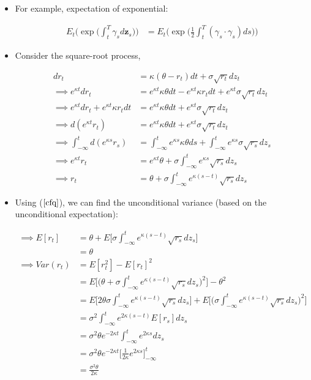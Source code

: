\documentclass{article}
\newcommand{\zbf}{\mathbf{z}}
\begin{document}
\begin{itemize}
\item For example, expectation of exponential:

\begin{align}
E_t \Bigg( \exp \Bigg( \int_t^T \gamma_s d\zbf_s \Bigg) \Bigg) 
&= E_t \Bigg( \exp \Bigg( \frac{1}{2} \int_t^T (\gamma_s \cdot \gamma_s)ds \Bigg) \Bigg) \label{cfe}
\end{align}

\item Consider the square-root process,

\begin{align*}
dr_t &= \kappa(\theta - r_t)dt + \sigma \sqrt{r_t} dz_t\\
\implies e^{\kappa t} dr_t &= e^{\kappa t}\kappa \theta dt  - e^{\kappa t} \kappa r_t dt + e^{\kappa t}\sigma \sqrt{r_t} dz_t \\
\implies e^{\kappa t} dr_t + e^{\kappa t} \kappa r_t dt&= e^{\kappa t}\kappa \theta dt  + e^{\kappa t}\sigma \sqrt{r_t} dz_t \\
\implies d(e^{\kappa t} r_t) &= e^{\kappa t}\kappa \theta dt  + e^{\kappa t}\sigma \sqrt{r_t} dz_t \\
\implies \int_{-\infty}^{t} d(e^{\kappa s} r_s) &= \int_{-\infty}^{t} e^{\kappa s}\kappa \theta ds  + \int_{-\infty}^{t} e^{\kappa s}\sigma \sqrt{r_s} dz_s \\
\implies e^{\kappa t} r_t &= e^{\kappa t}\theta  + \sigma\int_{-\infty}^{t} e^{\kappa s} \sqrt{r_s} dz_s \\
\implies r_t &= \theta  + \sigma\int_{-\infty}^{t} e^{\kappa (s-t)} \sqrt{r_s} dz_s
\end{align*}

\pagebreak

\item Using ($\ref{cfq}$), we can find the unconditional variance (based on the unconditional expectation):

\begin{align*}
\implies E[r_t] 
&= \theta  + E\Bigg[\sigma\int_{-\infty}^{t} e^{\kappa (s-t)} \sqrt{r_s}dz_s \Bigg] \\
&= \theta \\
\implies Var(r_t) 
&= E[r_t^2] - E[r_t]^2 \\
&= E\Bigg[\Bigg(\theta  + \sigma\int_{-\infty}^{t} e^{\kappa (s-t)} \sqrt{r_s}dz_s \Bigg)^2 \Bigg] - \theta^2 \\
&= E\Bigg[2\theta  \sigma\int_{-\infty}^{t} e^{\kappa (s-t)} \sqrt{r_s}dz_s \Bigg] 
+ E\Bigg[\Bigg( \sigma\int_{-\infty}^{t} e^{\kappa (s-t)} \sqrt{r_s}dz_s \Bigg)^2 \Bigg] \\
&= \sigma^2 \int_{-\infty}^{t} e^{2 \kappa (s-t)}  E[  r_s ] dz_s\\
&= \sigma^2 \theta e^{-2\kappa t} \int_{-\infty}^{t} e^{2 \kappa s} dz_s\\
&= \sigma^2 \theta e^{-2\kappa t} \Bigg[ \frac{1}{2\kappa}e^{2 \kappa s} \Bigg]_{-\infty}^{t}\\
&= \frac{\sigma^2 \theta}{2\kappa}
\end{align*}


\end{itemize}
\end{document}
